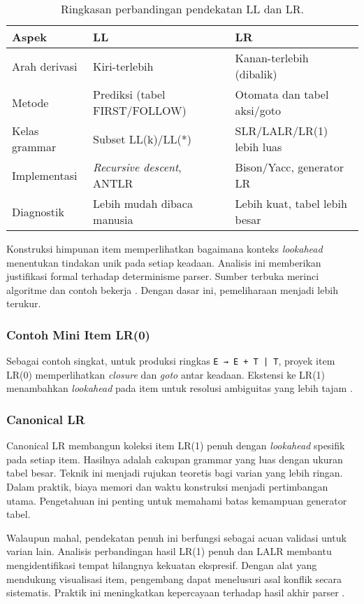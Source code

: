 \documentclass[../main.tex]{subfiles}
\begin{document}
\begin{table}[t]
  \centering
  \caption{Ringkasan perbandingan pendekatan LL dan LR.}
  \label{tab:ll-vs-lr}
  \begin{tabular}{@{}lll@{}}
    \toprule
    Aspek & LL & LR \\
    \midrule
    Arah derivasi & Kiri-terlebih & Kanan-terlebih (dibalik) \\
    Metode & Prediksi (tabel FIRST/FOLLOW) & Otomata dan tabel aksi/goto \\
    Kelas grammar & Subset LL(k)/LL(*) & SLR/LALR/LR(1) lebih luas \\
    Implementasi & \emph{Recursive descent}, ANTLR & Bison/Yacc, generator LR \\
    Diagnostik & Lebih mudah dibaca manusia & Lebih kuat, tabel lebih besar \\
    \bottomrule
  \end{tabular}
\end{table}

Konstruksi himpunan item memperlihatkan bagaimana konteks \emph{lookahead} menentukan tindakan unik pada setiap keadaan. Analisis ini memberikan justifikasi formal terhadap determinisme parser. Sumber terbuka merinci algoritme dan contoh bekerja \citep{WikiLR}. Dengan dasar ini, pemeliharaan menjadi lebih terukur.

\subsubsection{Contoh Mini Item LR(0)}
Sebagai contoh singkat, untuk produksi ringkas \texttt{E → E + T | T}, proyek item LR(0) memperlihatkan \emph{closure} dan \emph{goto} antar keadaan. Ekstensi ke LR(1) menambahkan \emph{lookahead} pada item untuk resolusi ambiguitas yang lebih tajam \citep{WikiLR,BisonManual}.

\subsubsection{Canonical LR}
Canonical LR membangun koleksi item LR(1) penuh dengan \emph{lookahead} spesifik pada setiap item. Hasilnya adalah cakupan grammar yang luas dengan ukuran tabel besar. Teknik ini menjadi rujukan teoretis bagi varian yang lebih ringan. Dalam praktik, biaya memori dan waktu konstruksi menjadi pertimbangan utama. Pengetahuan ini penting untuk memahami batas kemampuan generator tabel.

Walaupun mahal, pendekatan penuh ini berfungsi sebagai acuan validasi untuk varian lain. Analisis perbandingan hasil LR(1) penuh dan LALR membantu mengidentifikasi tempat hilangnya kekuatan ekspresif. Dengan alat yang mendukung visualisasi item, pengembang dapat menelusuri asal konflik secara sistematis. Praktik ini meningkatkan kepercayaan terhadap hasil akhir parser \citep{BisonManual}.
\end{document}
